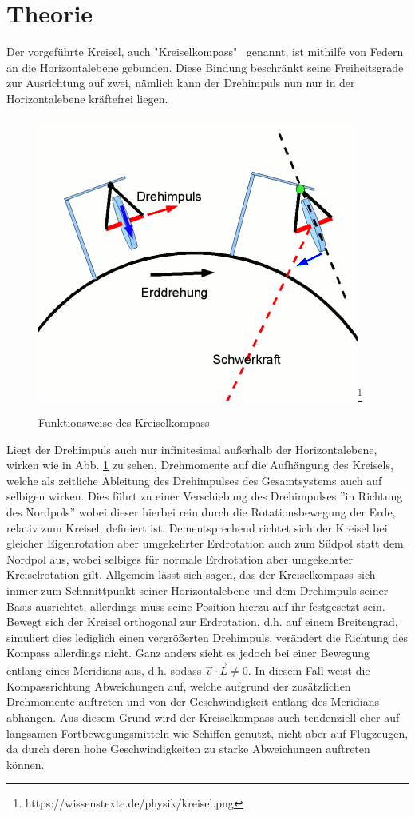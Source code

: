 \documentclass{include/protokollclass}
\begin{document}
    \section{Theorie}
    Der vorgeführte Kreisel, auch "Kreiselkompass" \ genannt, ist mithilfe von Federn an die Horizontalebene gebunden. Diese Bindung beschränkt seine Freiheitsgrade zur Ausrichtung auf zwei, nämlich kann der Drehimpuls nun nur in der Horizontalebene kräftefrei liegen.
    \begin{figure}
    \centering
    \includegraphics[scale=0.5]{fig/kreisel.png}\footnote{https://wissenstexte.de/physik/kreisel.png}
    \caption{Funktionsweise des Kreiselkompass}
    \label{F1}
    \end{figure}
    Liegt der Drehimpuls auch nur infinitesimal außerhalb der Horizontalebene, wirken wie in Abb. \ref{F1} zu sehen, Drehmomente auf die Aufhängung des Kreisels, welche als zeitliche Ableitung des Drehimpulses des Gesamtsystems auch auf selbigen wirken. Dies führt zu einer Verschiebung des Drehimpulses ''in Richtung des Nordpols'' wobei dieser hierbei rein durch die Rotationsbewegung der Erde, relativ zum Kreisel, definiert ist. Dementsprechend richtet sich der Kreisel bei gleicher Eigenrotation aber umgekehrter Erdrotation auch zum Südpol statt dem Nordpol aus, wobei selbiges für normale Erdrotation aber umgekehrter Kreiselrotation gilt. Allgemein lässt sich sagen, das der Kreiselkompass sich immer zum Schnnittpunkt seiner Horizontalebene und dem Drehimpuls seiner Basis ausrichtet, allerdings muss seine Position hierzu auf ihr festgesetzt sein. Bewegt sich der Kreisel orthogonal zur Erdrotation, d.h. auf einem Breitengrad, simuliert dies lediglich einen vergrößerten Drehimpuls, verändert die Richtung des Kompass allerdings nicht. Ganz anders sieht es jedoch bei einer Bewegung entlang eines Meridians aus, d.h. sodass $\vec{v}\cdot \vec{L} \not= 0$. In diesem Fall weist die Kompassrichtung Abweichungen auf, welche aufgrund der zusätzlichen Drehmomente auftreten und von der Geschwindigkeit entlang des Meridians abhängen. Aus diesem Grund wird der Kreiselkompass auch tendenziell eher auf langsamen Fortbewegungsmitteln wie Schiffen genutzt, nicht aber auf Flugzeugen, da durch deren hohe Geschwindigkeiten zu starke Abweichungen auftreten können.
\end{document}
